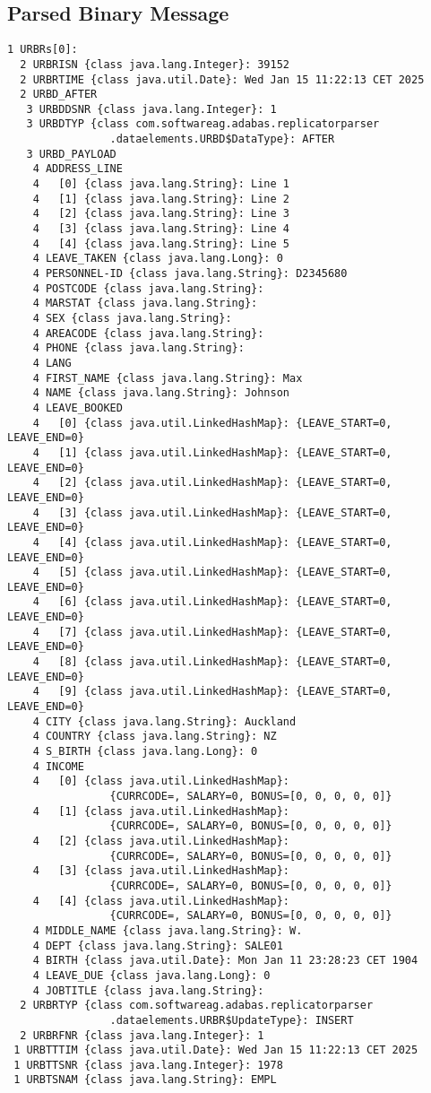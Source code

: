 \subsection{Parsed Binary Message}
\label{appendix01:binarymessageexample:parsedmessage}
\begin{verbatim}
1 URBRs[0]: 
  2 URBRISN {class java.lang.Integer}: 39152
  2 URBRTIME {class java.util.Date}: Wed Jan 15 11:22:13 CET 2025
  2 URBD_AFTER
   3 URBDDSNR {class java.lang.Integer}: 1
   3 URBDTYP {class com.softwareag.adabas.replicatorparser
                .dataelements.URBD$DataType}: AFTER
   3 URBD_PAYLOAD
    4 ADDRESS_LINE
    4   [0] {class java.lang.String}: Line 1
    4   [1] {class java.lang.String}: Line 2
    4   [2] {class java.lang.String}: Line 3
    4   [3] {class java.lang.String}: Line 4
    4   [4] {class java.lang.String}: Line 5
    4 LEAVE_TAKEN {class java.lang.Long}: 0
    4 PERSONNEL-ID {class java.lang.String}: D2345680
    4 POSTCODE {class java.lang.String}: 
    4 MARSTAT {class java.lang.String}: 
    4 SEX {class java.lang.String}: 
    4 AREACODE {class java.lang.String}: 
    4 PHONE {class java.lang.String}: 
    4 LANG
    4 FIRST_NAME {class java.lang.String}: Max
    4 NAME {class java.lang.String}: Johnson
    4 LEAVE_BOOKED
    4   [0] {class java.util.LinkedHashMap}: {LEAVE_START=0, LEAVE_END=0}
    4   [1] {class java.util.LinkedHashMap}: {LEAVE_START=0, LEAVE_END=0}
    4   [2] {class java.util.LinkedHashMap}: {LEAVE_START=0, LEAVE_END=0}
    4   [3] {class java.util.LinkedHashMap}: {LEAVE_START=0, LEAVE_END=0}
    4   [4] {class java.util.LinkedHashMap}: {LEAVE_START=0, LEAVE_END=0}
    4   [5] {class java.util.LinkedHashMap}: {LEAVE_START=0, LEAVE_END=0}
    4   [6] {class java.util.LinkedHashMap}: {LEAVE_START=0, LEAVE_END=0}
    4   [7] {class java.util.LinkedHashMap}: {LEAVE_START=0, LEAVE_END=0}
    4   [8] {class java.util.LinkedHashMap}: {LEAVE_START=0, LEAVE_END=0}
    4   [9] {class java.util.LinkedHashMap}: {LEAVE_START=0, LEAVE_END=0}
    4 CITY {class java.lang.String}: Auckland
    4 COUNTRY {class java.lang.String}: NZ
    4 S_BIRTH {class java.lang.Long}: 0
    4 INCOME
    4   [0] {class java.util.LinkedHashMap}:
                {CURRCODE=, SALARY=0, BONUS=[0, 0, 0, 0, 0]}
    4   [1] {class java.util.LinkedHashMap}:
                {CURRCODE=, SALARY=0, BONUS=[0, 0, 0, 0, 0]}
    4   [2] {class java.util.LinkedHashMap}:
                {CURRCODE=, SALARY=0, BONUS=[0, 0, 0, 0, 0]}
    4   [3] {class java.util.LinkedHashMap}:
                {CURRCODE=, SALARY=0, BONUS=[0, 0, 0, 0, 0]}
    4   [4] {class java.util.LinkedHashMap}:
                {CURRCODE=, SALARY=0, BONUS=[0, 0, 0, 0, 0]}
    4 MIDDLE_NAME {class java.lang.String}: W.
    4 DEPT {class java.lang.String}: SALE01
    4 BIRTH {class java.util.Date}: Mon Jan 11 23:28:23 CET 1904
    4 LEAVE_DUE {class java.lang.Long}: 0
    4 JOBTITLE {class java.lang.String}: 
  2 URBRTYP {class com.softwareag.adabas.replicatorparser
                .dataelements.URBR$UpdateType}: INSERT
  2 URBRFNR {class java.lang.Integer}: 1
 1 URBTTTIM {class java.util.Date}: Wed Jan 15 11:22:13 CET 2025
 1 URBTTSNR {class java.lang.Integer}: 1978
 1 URBTSNAM {class java.lang.String}: EMPL
\end{verbatim}

